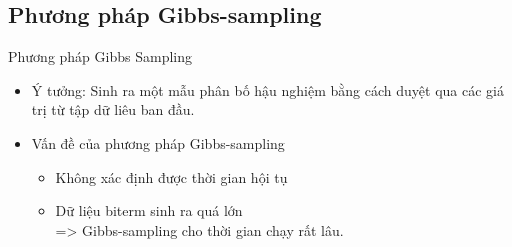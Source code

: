 \documentclass[pdf]{beamer}
\begin{document}
\subsection{Phương pháp Gibbs-sampling}
\begin{frame}{Phương pháp Gibbs Sampling}
\begin{itemize}
	\item Ý tưởng: Sinh ra một mẫu phân bố hậu nghiệm bằng cách duyệt qua các giá trị từ tập dữ liêu ban đầu.
	\item Vấn đề của phương pháp Gibbs-sampling
		\begin{itemize}
			\item Không xác định được thời gian hội tụ
			\item Dữ liệu biterm sinh ra quá lớn\\
			=> Gibbs-sampling cho thời gian chạy rất lâu.
		\end{itemize} 
\end{itemize}
\end{frame}
%
\end{document}

